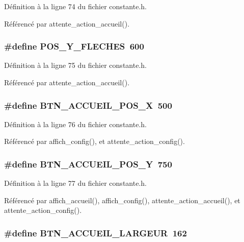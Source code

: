 D\'{e}finition \`{a} la ligne 74 du fichier constante.h.

R\'{e}f\'{e}renc\'{e} par attente\_\-action\_\-accueil().
\subsubsection{\setlength{\rightskip}{0pt plus 5cm}\#define POS\_\-Y\_\-FLECHES~600}\label{constante_8h_8bfbf2c73da39b6a9f456072186a73f6}




D\'{e}finition \`{a} la ligne 75 du fichier constante.h.

R\'{e}f\'{e}renc\'{e} par attente\_\-action\_\-accueil().
\subsubsection{\setlength{\rightskip}{0pt plus 5cm}\#define BTN\_\-ACCUEIL\_\-POS\_\-X~500}\label{constante_8h_4e4f6840a2be47892bb8b1d739117513}




D\'{e}finition \`{a} la ligne 76 du fichier constante.h.

R\'{e}f\'{e}renc\'{e} par affich\_\-config(), et attente\_\-action\_\-config().
\subsubsection{\setlength{\rightskip}{0pt plus 5cm}\#define BTN\_\-ACCUEIL\_\-POS\_\-Y~750}\label{constante_8h_c120c3b086f912ea4ba446fb14ed2d16}




D\'{e}finition \`{a} la ligne 77 du fichier constante.h.

R\'{e}f\'{e}renc\'{e} par affich\_\-accueil(), affich\_\-config(), attente\_\-action\_\-accueil(), et attente\_\-action\_\-config().
\subsubsection{\setlength{\rightskip}{0pt plus 5cm}\#define BTN\_\-ACCUEIL\_\-LARGEUR~162}\label{constante_8h_4333462be893a33f166e6ab9ddbd9cd8}




